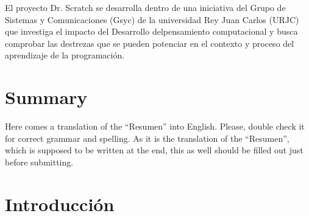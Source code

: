 \documentclass[a4paper, 12pt]{book}
\begin{document}
El proyecto Dr. Scratch se desarrolla dentro de una iniciativa del Grupo de Sistemas
y Comunicaciones (Gsyc) de la universidad Rey Juan Carlos (URJC) que investiga el
impacto del Desarrollo delpensamiento computacional y busca comprobar las destrezas
que se pueden potenciar en el contexto y proceso del aprendizaje de la programación.




\chapter*{Summary}

Here comes a translation of the ``Resumen'' into English. Please, double check
it for correct grammar and spelling. As it is the translation of the ``Resumen'',
which is supposed to be written at the end, this as well should be filled out
just before submitting.




\tableofcontents
\cleardoublepage
\listoffigures %



\cleardoublepage
\chapter{Introducción}
\label{sec:intro} %
\end{document}
